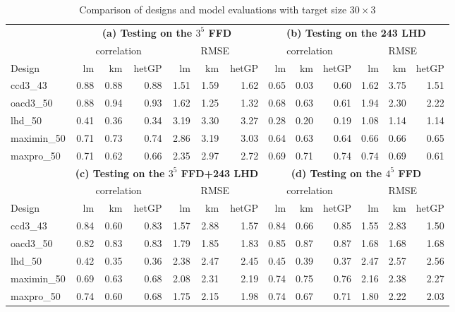 \documentclass [PhD] {package/uclathes}
\begin{document}
\begin{table}

\caption{\label{tab:tab1}Comparison of designs and model evaluations with target size $30 \times 3$}
\centering
\begin{tabular}[t]{|l|r|r|r|r|r|r|r|r|r|r|r|r|}
\hline
\multicolumn{1}{|c|}{\textbf{ }} & \multicolumn{6}{|c|}{\textbf{(a) Testing on the $3^5$ FFD}} & \multicolumn{6}{|c|}{\textbf{(b) Testing on the 243 LHD}} \\
\cline{2-7} \cline{8-13}
\multicolumn{1}{|c|}{ } & \multicolumn{3}{|c|}{correlation} & \multicolumn{3}{|c|}{RMSE} & \multicolumn{3}{|c|}{correlation} & \multicolumn{3}{|c|}{RMSE} \\
\cline{2-4} \cline{5-7} \cline{8-10} \cline{11-13}
Design & lm & km & hetGP & lm & km & hetGP & lm & km & hetGP & lm & km & hetGP\\
\hline
ccd3\_43 & 0.88 & 0.88 & 0.88 & 1.51 & 1.59 & 1.62 & 0.65 & 0.03 & 0.60 & 1.62 & 3.75 & 1.51\\
\hline
oacd3\_50 & 0.88 & 0.94 & 0.93 & 1.62 & 1.25 & 1.32 & 0.68 & 0.63 & 0.61 & 1.94 & 2.30 & 2.22\\
\hline
lhd\_50 & 0.41 & 0.36 & 0.34 & 3.19 & 3.30 & 3.27 & 0.28 & 0.20 & 0.19 & 1.08 & 1.14 & 1.14\\
\hline
maximin\_50 & 0.71 & 0.73 & 0.74 & 2.86 & 3.19 & 3.03 & 0.64 & 0.63 & 0.64 & 0.66 & 0.66 & 0.65\\
\hline
maxpro\_50 & 0.71 & 0.62 & 0.66 & 2.35 & 2.97 & 2.72 & 0.69 & 0.71 & 0.74 & 0.74 & 0.69 & 0.61\\
\hline
 

\multicolumn{1}{|c|}{\textbf{ }} & \multicolumn{6}{|c|}{\textbf{(c) Testing on the $3^5$ FFD+243 LHD}} & \multicolumn{6}{|c|}{\textbf{(d) Testing on the $4^5$ FFD}} \\
\cline{2-7} \cline{8-13}
\multicolumn{1}{|c|}{ } & \multicolumn{3}{|c|}{correlation} & \multicolumn{3}{|c|}{RMSE} & \multicolumn{3}{|c|}{correlation} & \multicolumn{3}{|c|}{RMSE} \\
\cline{2-4} \cline{5-7} \cline{8-10} \cline{11-13}
Design & lm & km & hetGP & lm & km & hetGP & lm & km & hetGP & lm & km & hetGP\\
\hline
ccd3\_43 & 0.84 & 0.60 & 0.83 & 1.57 & 2.88 & 1.57 & 0.84 & 0.66 & 0.85 & 1.55 & 2.83 & 1.50\\
\hline
oacd3\_50 & 0.82 & 0.83 & 0.83 & 1.79 & 1.85 & 1.83 & 0.85 & 0.87 & 0.87 & 1.68 & 1.68 & 1.68\\
\hline
lhd\_50 & 0.42 & 0.35 & 0.36 & 2.38 & 2.47 & 2.45 & 0.45 & 0.39 & 0.37 & 2.47 & 2.57 & 2.56\\
\hline
maximin\_50 & 0.69 & 0.63 & 0.68 & 2.08 & 2.31 & 2.19 & 0.74 & 0.75 & 0.76 & 2.16 & 2.38 & 2.27\\
\hline
maxpro\_50 & 0.74 & 0.60 & 0.68 & 1.75 & 2.15 & 1.98 & 0.74 & 0.67 & 0.71 & 1.80 & 2.22 & 2.03\\
\hline
\end{tabular}
\end{table} 
\end{document}
